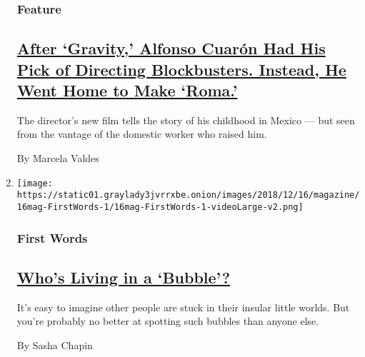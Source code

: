 \begin{enumerate}
  \hypertarget{feature-1}{%
  \subsubsection{Feature}\label{feature-1}}

  \hypertarget{after-gravity-alfonso-cuaruxf3n-had-his-pick-of-directing-blockbusters-instead-he-went-home-to-make-roma}{%
  \subsection{\texorpdfstring{\href{/2018/12/13/magazine/alfonso-cuaron-roma-mexico-netflix.html}{After
  `Gravity,' Alfonso Cuarón Had His Pick of Directing Blockbusters.
  Instead, He Went Home to Make
  `Roma.'}}{After `Gravity,' Alfonso Cuarón Had His Pick of Directing Blockbusters. Instead, He Went Home to Make `Roma.'}}\label{after-gravity-alfonso-cuaruxf3n-had-his-pick-of-directing-blockbusters-instead-he-went-home-to-make-roma}}

  The director's new film tells the story of his childhood in Mexico ---
  but seen from the vantage of the domestic worker who raised him.

  By Marcela Valdes
\item
  \texttt{[image: https://static01.graylady3jvrrxbe.onion/images/2018/12/16/magazine/16mag-FirstWords-1/16mag-FirstWords-1-videoLarge-v2.png]}

  \hypertarget{first-words}{%
  \subsubsection{First Words}\label{first-words}}

  \hypertarget{whos-living-in-a-bubble}{%
  \subsection{\texorpdfstring{\href{/2018/12/11/magazine/whos-living-in-a-bubble.html}{Who's
  Living in a
  `Bubble'?}}{Who's Living in a `Bubble'?}}\label{whos-living-in-a-bubble}}

  It's easy to imagine other people are stuck in their insular little
  worlds. But you're probably no better at spotting such bubbles than
  anyone else.

  By Sasha Chapin
\end{enumerate}

